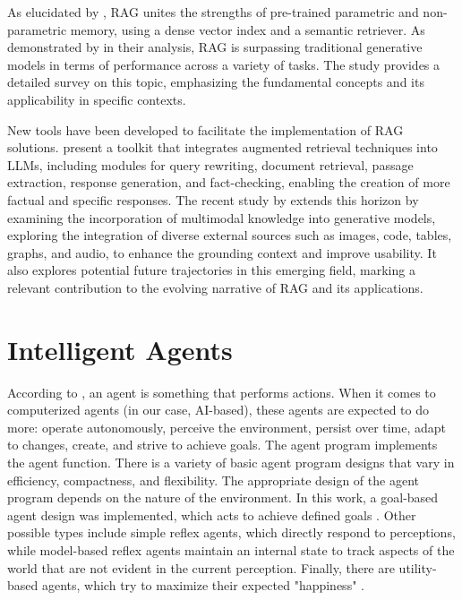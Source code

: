             As elucidated by \citet{Lewis2020}, RAG unites the strengths of pre-trained parametric and non-parametric memory, using a dense vector index and a semantic retriever. 
            As demonstrated by \citet{Li2022} in their analysis, RAG is surpassing traditional generative models in terms of performance across a variety of tasks. The study provides a detailed survey on this topic, emphasizing the fundamental concepts and its applicability in specific contexts.

            New tools have been developed to facilitate the implementation of RAG solutions. \citet{Liu2023} present a toolkit that integrates augmented retrieval techniques into LLMs, including modules for query rewriting, document retrieval, passage extraction, response generation, and fact-checking, enabling the creation of more factual and specific responses. The recent study by \citet{Zhao2023} extends this horizon by examining the incorporation of multimodal knowledge into generative models, exploring the integration of diverse external sources such as images, code, tables, graphs, and audio, to enhance the grounding context and improve usability. It also explores potential future trajectories in this emerging field, marking a relevant contribution to the evolving narrative of RAG and its applications.

        \section{Intelligent Agents} 
            According to \citet{Russell2020}, an agent is something that performs actions. When it comes to computerized agents (in our case, AI-based), these agents are expected to do more: operate autonomously, perceive the environment, persist over time, adapt to changes, create, and strive to achieve goals.
            The agent program implements the agent function.
            There is a variety of basic agent program designs that vary in efficiency, compactness, and flexibility. The appropriate design of the agent program depends on the nature of the environment. In this work, a goal-based agent design was implemented, which acts to achieve defined goals \citep{Russell2020}.
            Other possible types include simple reflex agents, which directly respond to perceptions, while model-based reflex agents maintain an internal state to track aspects of the world that are not evident in the current perception. Finally, there are utility-based agents, which try to maximize their expected "happiness" \citep{Russell2020}.
            
